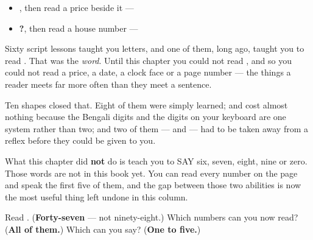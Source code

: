 \begin{itemize}
\raggedright
  \item \textbf{}, then read a price beside it — \textbf{}
  \item \textbf{?}, then read a house number — \textbf{}
\end{itemize}

\begin{grammarlens}[title={What you've built this chapter}]
Sixty script lessons taught you letters, and one of them, long ago, taught you to read \textbf{}. That was the \emph{word}. Until this chapter you could not read \textbf{}, and so you could not read a price, a date, a clock face or a page number — the things a reader meets far more often than they meet a sentence.

Ten shapes closed that. Eight of them were simply learned; \textbf{} and \textbf{} cost almost nothing because the Bengali digits and the digits on your keyboard are one system rather than two; and two of them — \textbf{} and \textbf{} — had to be taken away from a reflex before they could be given to you.

What this chapter did \textbf{not} do is teach you to SAY six, seven, eight, nine or zero. Those words are not in this book yet. You can read every number on the page and speak the first five of them, and the gap between those two abilities is now the most useful thing left undone in this column.
\end{grammarlens}

\begin{tcolorbox}[breakable,colback=teal!4,colframe=teal!35!black,title={Before you move on}]
Read \textbf{}. (\textbf{Forty-seven} — not ninety-eight.) Which numbers can you now read? (\textbf{All of them.}) Which can you say? (\textbf{One to five.})
\end{tcolorbox}
